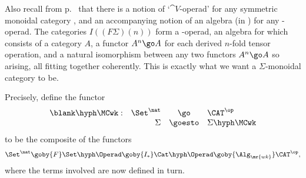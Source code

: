 Also recall from p.~\pageref{p:defn-V-Operad} that there is a notion of
`$\cat{V}$-operad' for any symmetric monoidal category , and an
accompanying notion of an algebra (in ) for any -operad.  The
categories $I((F\Sigma)(n))$ form a \Cat-operad, an algebra for which
consists of a category $A$, a functor $A^n \go A$ for each derived $n$-fold
tensor operation, and a natural isomorphism between any two functors $A^n
\go A$ so arising, all fitting together coherently.
This is exactly what we want a $\Sigma$-monoidal category to
be.

Precisely, define the functor
\[
\begin{array}{rrcl}
\blank\hyph\MCwk: 	&\Set^\nat	&\go	&\CAT^\op	\\
			&\Sigma		&\goesto&\Sigma\hyph\MCwk
\end{array}
\]%
% 
%
% 
to be the composite of the functors
\[
\Set^\nat \goby{F} 
\Set\hyph\Operad \goby{I_*}
\Cat\hyph\Operad \goby{\Alg_\mr{wk}}
\CAT^\op,
\]%
% 
%
% 
where the terms involved are now defined in turn.
%
